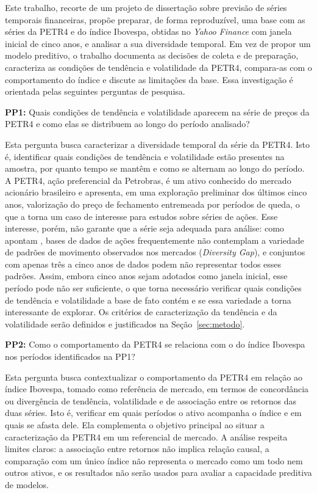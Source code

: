 \documentclass[12pt,a4paper]{article}
\begin{document}
Este trabalho, recorte de um projeto de dissertação sobre previsão de séries temporais financeiras, propõe preparar, de forma reproduzível, uma base com as séries da PETR4 e do índice Ibovespa, obtidas no \textit{Yahoo Finance} com janela inicial de cinco anos, e analisar a sua diversidade temporal. Em vez de propor um modelo preditivo, o trabalho documenta as decisões de coleta e de preparação, caracteriza as condições de tendência e volatilidade da PETR4, compara-as com o comportamento do índice e discute as limitações da base. Essa investigação é orientada pelas seguintes perguntas de pesquisa.

\textbf{PP1:} Quais condições de tendência e volatilidade aparecem na série de preços da PETR4 e como elas se distribuem ao longo do período analisado?

Esta pergunta busca caracterizar a diversidade temporal da série da PETR4. Isto é, identificar quais condições de tendência e volatilidade estão presentes na amostra, por quanto tempo se mantêm e como se alternam ao longo do período. A PETR4, ação preferencial da Petrobras, é um ativo conhecido do mercado acionário brasileiro e apresenta, em uma exploração preliminar dos últimos cinco anos, valorização do preço de fechamento entremeada por períodos de queda, o que a torna um caso de interesse para estudos sobre séries de ações. Esse interesse, porém, não garante que a série seja adequada para análise: como apontam \textcite{hu_fintsb_2025}, bases de dados de ações frequentemente não contemplam a variedade de padrões de movimento observados nos mercados (\textit{Diversity Gap}), e conjuntos com apenas três a cinco anos de dados podem não representar todos esses padrões. Assim, embora cinco anos sejam adotados como janela inicial, esse período pode não ser suficiente, o que torna necessário verificar quais condições de tendência e volatilidade a base de fato contém e se essa variedade a torna interessante de explorar. Os critérios de caracterização da tendência e da volatilidade serão definidos e justificados na Seção~\ref{sec:metodo}.

\textbf{PP2:} Como o comportamento da PETR4 se relaciona com o do índice Ibovespa nos períodos identificados na PP1?

Esta pergunta busca contextualizar o comportamento da PETR4 em relação ao índice Ibovespa, tomado como referência de mercado, em termos de concordância ou divergência de tendência, volatilidade e de associação entre os retornos das duas séries. Isto é, verificar em quais períodos o ativo acompanha o índice e em quais se afasta dele. Ela complementa o objetivo principal ao situar a caracterização da PETR4 em um referencial de mercado. A análise respeita limites claros: a associação entre retornos não implica relação causal, a comparação com um único índice não representa o mercado como um todo nem outros ativos, e os resultados não serão usados para avaliar a capacidade preditiva de modelos.
\end{document}
